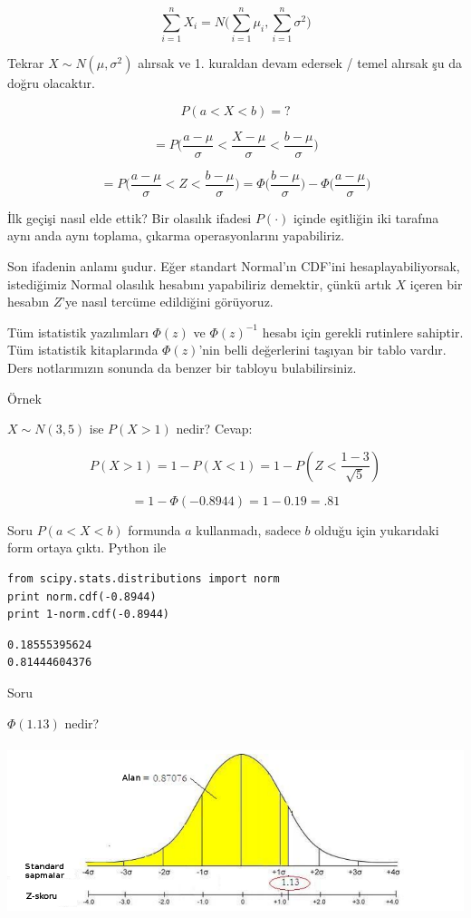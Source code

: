\documentclass[12pt,fleqn]{article}\usepackage{../../common}
\begin{document}
$$ \sum_{i=1}^n X_i = N\bigg( \sum_{i=1}^n\mu_i, \sum_{i=1}^n\sigma^2 \bigg) $$

Tekrar $X \sim N(\mu, \sigma^2)$ alırsak ve 1. kuraldan devam edersek /
temel alırsak şu da doğru olacaktır. 

$$ P(a < X < b) = ? $$

$$ 
= P\bigg(
\frac{a-\mu}{\sigma} < 
\frac{X-\mu}{\sigma} < 
\frac{b-\mu}{\sigma}
\bigg) 
$$

$$
= P\bigg(\frac{a-\mu}{\sigma} < Z < \frac{b-\mu}{\sigma}\bigg) 
= 
\Phi\bigg(\frac{b-\mu}{\sigma}\bigg) - 
\Phi\bigg(\frac{a-\mu}{\sigma}\bigg) 
$$

İlk geçişi nasıl elde ettik? Bir olasılık ifadesi $P(\cdot)$ içinde eşitliğin iki
tarafına aynı anda aynı toplama, çıkarma operasyonlarını yapabiliriz. 

Son ifadenin anlamı şudur. Eğer standart Normal'ın CDF'ini
hesaplayabiliyorsak, istediğimiz Normal olasılık hesabını yapabiliriz
demektir, çünkü artık $X$ içeren bir hesabın $Z$'ye nasıl tercüme
edildiğini görüyoruz. 

Tüm istatistik yazılımları $\Phi(z)$ ve $\Phi(z)^{-1}$ hesabı için gerekli
rutinlere sahiptir. Tüm istatistik kitaplarında $\Phi(z)$'nin belli
değerlerini taşıyan bir tablo vardır. Ders notlarımızın sonunda da benzer
bir tabloyu bulabilirsiniz. 

Örnek 

$X \sim N(3,5)$ ise $P(X > 1)$ nedir? Cevap:

$$ 
P(X>1) = 1 - P(X < 1) = 1 - P( Z < \frac{ 1 - 3}{\sqrt{5 }}) 
 $$

$$ = 1 - \Phi(-0.8944) =  1 - 0.19 = .81 $$

Soru $P(a < X < b)$ formunda $a$ kullanmadı, sadece $b$ olduğu için
yukarıdaki form ortaya çıktı. Python ile

\begin{verbatim}
from scipy.stats.distributions import norm
print norm.cdf(-0.8944)
print 1-norm.cdf(-0.8944)
\end{verbatim}

\begin{verbatim}
0.18555395624
0.81444604376
\end{verbatim}

Soru

$\Phi(1.13)$ nedir? 

\includegraphics[height=5cm]{stat_intro_06.png}
\end{document}
